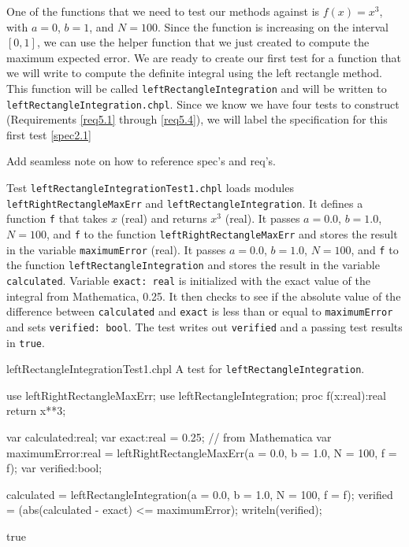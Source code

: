 One of the functions that we need to test our methods against is $f(x) = x^3$, 
with $a=0$, $b=1$, and $N=100$.
Since the function is increasing on the interval $[0,1]$, we can use 
the helper function that we just created to compute the maximum expected error. We are
ready to create our first test for a function that we will write to compute the definite
integral using the left rectangle method. This function will be called 
\lstinline{leftRectangleIntegration}
and will be written to \lstinline{leftRectangleIntegration.chpl}.
Since we know we have four tests to construct (Requirements \ref{req5.1} through \ref{req5.4}),
we will label the specification for this first test \ref{spec2.1}
\begin{TODO}
  Add seamless note on how to reference spec's and req's.
\end{TODO}

\begin{enumspec}
\item{}
Test \lstinline{leftRectangleIntegrationTest1.chpl} loads modules
\lstinline{leftRightRectangleMaxErr} and
\lstinline{leftRectangleIntegration}.
It defines a function \lstinline{f} that takes $x$ (real) and returns $x^3$ (real).
It passes $a=0.0$, $b=1.0$, $N=100$, and \lstinline{f} to the function
\lstinline{leftRightRectangleMaxErr} and stores the result in the variable
\lstinline{maximumError} (real).
It passes $a=0.0$, $b=1.0$, $N=100$, and \lstinline{f} to the function
\lstinline{leftRectangleIntegration} and stores the result in the variable
\lstinline{calculated}.
Variable \lstinline{exact: real} is initialized with the exact value of the integral from
Mathematica, 0.25.
It then checks to see if the absolute value of the difference between \lstinline{calculated} 
and \lstinline{exact} is less than or equal to \lstinline{maximumError} and sets 
\lstinline{verified: bool}. The test writes out \lstinline{verified} and a passing
test results in \lstinline{true}.
\end{enumspec}

\begin{chapelexample}{leftRectangleIntegrationTest1.chpl}
A test for \lstinline{leftRectangleIntegration}.
\begin{chapelpre}
\end{chapelpre}
\begin{chapel}
use leftRightRectangleMaxErr;
use leftRectangleIntegration;
proc f(x:real):real {
  return x**3;
} 
  
var calculated:real;
var exact:real = 0.25;  // from Mathematica
var maximumError:real = leftRightRectangleMaxErr(a = 0.0, b = 1.0, N = 100, f = f);
var verified:bool;

calculated = leftRectangleIntegration(a = 0.0, b = 1.0, N = 100, f = f);
verified = (abs(calculated - exact) <= maximumError);
writeln(verified);
\end{chapel}
\begin{chapelpost}
\end{chapelpost}
\begin{chapeloutput}
true
\end{chapeloutput}
\end{chapelexample}

